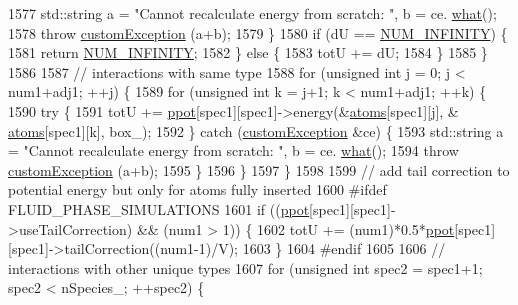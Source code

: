\begin{DoxyCode}
1577                 std::string a = \textcolor{stringliteral}{"Cannot recalculate energy from scratch: "}, b = ce.
      \hyperlink{classcustom_exception_aeb6ab5848b038adfc68fde86a512f691}{what}();
1578                 \textcolor{keywordflow}{throw} \hyperlink{classcustom_exception}{customException} (a+b);
1579             \}
1580             \textcolor{keywordflow}{if} (dU == \hyperlink{potentials_8h_ab94ab1d09e2291d03fe92a0e24a9d33b}{NUM\_INFINITY}) \{
1581                 \textcolor{keywordflow}{return} \hyperlink{potentials_8h_ab94ab1d09e2291d03fe92a0e24a9d33b}{NUM\_INFINITY};
1582             \} \textcolor{keywordflow}{else} \{
1583                 totU += dU;
1584             \}
1585         \}
1586 
1587         \textcolor{comment}{// interactions with same type}
1588         \textcolor{keywordflow}{for} (\textcolor{keywordtype}{unsigned} \textcolor{keywordtype}{int} j = 0; j < num1+adj1; ++j) \{
1589             \textcolor{keywordflow}{for} (\textcolor{keywordtype}{unsigned} \textcolor{keywordtype}{int} k = j+1; k < num1+adj1; ++k) \{
1590                 \textcolor{keywordflow}{try} \{
1591                     totU += \hyperlink{classsim_system_ad2e290b5963f132e6a3a56cee35c8e9f}{ppot}[spec1][spec1]->energy(&\hyperlink{classsim_system_a90421b19082f7fb8fc23b7264b1161e4}{atoms}[spec1][j], &
      \hyperlink{classsim_system_a90421b19082f7fb8fc23b7264b1161e4}{atoms}[spec1][k], box\_);
1592                 \} \textcolor{keywordflow}{catch} (\hyperlink{classcustom_exception}{customException} &ce) \{
1593                     std::string a = \textcolor{stringliteral}{"Cannot recalculate energy from scratch: "}, b = ce.
      \hyperlink{classcustom_exception_aeb6ab5848b038adfc68fde86a512f691}{what}();
1594                     \textcolor{keywordflow}{throw} \hyperlink{classcustom_exception}{customException} (a+b);
1595                 \}
1596             \}
1597         \}
1598 
1599         \textcolor{comment}{// add tail correction to potential energy but only for atoms fully inserted}
1600 \textcolor{preprocessor}{#ifdef FLUID\_PHASE\_SIMULATIONS}
1601 \textcolor{preprocessor}{}        \textcolor{keywordflow}{if} ((\hyperlink{classsim_system_ad2e290b5963f132e6a3a56cee35c8e9f}{ppot}[spec1][spec1]->useTailCorrection) && (num1 > 1)) \{
1602             totU += (num1)*0.5*\hyperlink{classsim_system_ad2e290b5963f132e6a3a56cee35c8e9f}{ppot}[spec1][spec1]->tailCorrection((num1-1)/V);
1603         \}
1604 \textcolor{preprocessor}{#endif}
1605 \textcolor{preprocessor}{}
1606         \textcolor{comment}{// interactions with other unique types}
1607         \textcolor{keywordflow}{for} (\textcolor{keywordtype}{unsigned} \textcolor{keywordtype}{int} spec2 = spec1+1; spec2 < nSpecies\_; ++spec2) \{

\end{DoxyCode}
